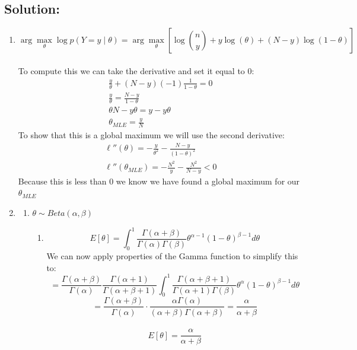 \documentclass[submit]{harvardml}
\begin{document}
\subsection*{Solution:}
\begin{enumerate}
    \item  
    $$\arg \max_{\theta} \log p(Y = y \mid \theta) = \arg \max_{\theta} [\log {n\choose y} + y\log (\theta) + (N-y)\log (1-\theta)]$$\\
    To compute this we can take the derivative and set it equal to 0:\\
        \begin{align*}
            \frac{y}{\theta} + (N-y)(-1)\frac{1}{1-\theta} = 0\\
            \frac{y}{\theta} = \frac{N-y}{1-\theta}\\
            \theta N - y\theta = y - y \theta\\
            \boxed{\theta_{MLE} = \frac{y}{N}}
        \end{align*}
    To show that this is a global maximum we will use the second derivative:\\
        \begin{align*}
            \ell''(\theta) = -\frac{y}{\theta^2} - \frac{N-y}{(1-\theta)^2}\\
            \ell''(\theta_{MLE}) = -\frac{N^2}{y} - \frac{N^2}{N-y} < 0
        \end{align*}
    Because this is less than 0 we know we have found a global maximum for our $\theta_{MLE}$\\
    \item
    \begin{enumerate}
        \item $\theta \sim Beta(\alpha, \beta)$\\\begin{enumerate}
            \item 
            $$E[\theta] = \int_0^1\frac{\Gamma(\alpha + \beta)}{\Gamma(\alpha)\Gamma(\beta)}\theta^{\alpha-1} (1-\theta)^{\beta -1}d\theta$$ 
            We can now apply properties of the Gamma function to simplify this to:\\
            $$= \frac{\Gamma(\alpha + \beta)}{\Gamma(\alpha)} \frac{\Gamma(\alpha + 1)}{\Gamma(\alpha + \beta + 1)}\int_0^1\frac{\Gamma(\alpha + \beta + 1)}{\Gamma(\alpha+1)\Gamma(\beta)}\theta^\alpha (1-\theta)^{\beta -1}d\theta$$
            $$= \frac{\Gamma(\alpha + \beta)}{\Gamma(\alpha)}\cdot \frac{\alpha\Gamma(\alpha)}{(\alpha+\beta)\Gamma(\alpha + \beta)} = \frac{\alpha}{\alpha+\beta}$$\\
            $$\boxed{E[\theta] = \frac{\alpha}{\alpha + \beta}}$$


\end{enumerate}
\end{enumerate}
\end{enumerate}
\end{document}
